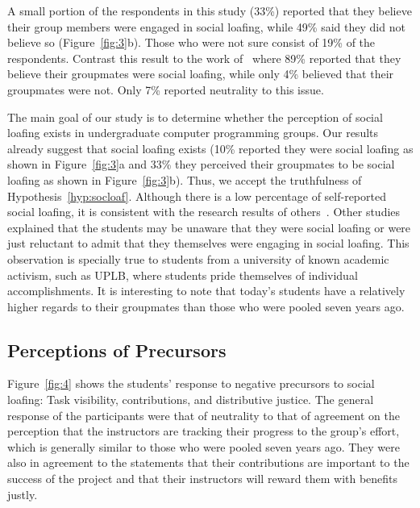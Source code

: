 \documentclass[a4paper,a4paper,BCOR12mm,12pt,abstracton,pointednumbers,tablecaptionabove,footinclude,halfparskip,normalheadings,]{scrartcl}
\begin{document}
\begin{figure*}[hbt]
\centering{}
\caption{The respondents agreement that (a)~they were engaged in social loafing and (b)~their perception that their groupmates were engaged in social loafing. The data from seven years ago came from~\citet{Pabico08}.}\label{fig:3}
\end{figure*}

A small portion of the respondents in this study (33\%) reported that they believe their group members were engaged in social loafing, while 49\% said they did not believe so (Figure~\ref{fig:3}b). Those who were not sure consist of 19\% of the respondents. Contrast this result to the work of~\citet{Pabico08} where 89\% reported that they believe their groupmates were social loafing, while only 4\% believed that their groupmates were not. Only 7\% reported neutrality to this issue.

The main goal of our study is to determine whether the perception of social loafing exists in undergraduate computer programming groups. Our results already suggest that social loafing exists (10\% reported they were social loafing as shown in Figure~\ref{fig:3}a and 33\% they perceived their groupmates to be social loafing as shown in Figure~\ref{fig:3}b). Thus, we accept the truthfulness of Hypothesis~\ref{hyp:socloaf}. Although there is a low percentage of self-reported social loafing, it is consistent with the research results of others~\citep{Karau93}. Other studies explained that the students may be unaware that they were social loafing or were just reluctant to admit that they themselves were engaging in social loafing. This observation is specially true to students from a university of known academic activism, such as UPLB, where students pride themselves of individual accomplishments. It is interesting to note that today's students have a relatively higher regards to their groupmates than those who were pooled seven years ago.

\subsection{Perceptions of Precursors}

Figure~\ref{fig:4} shows the students' response to negative precursors to social loafing: Task visibility, contributions, and distributive justice. The general response of the participants were that of neutrality to that of agreement on the perception that the instructors are tracking their progress to the group's effort, which is generally similar to those who were pooled seven years ago. They were also in agreement to the statements that their contributions are important to the success of the project and that their instructors will reward them with benefits justly.
\end{document}
